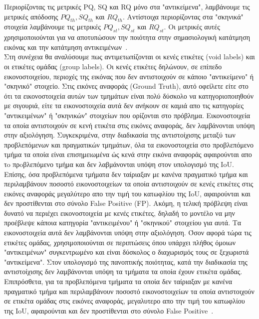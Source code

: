 \documentclass[12pt]{article}
\numberwithin{equation}{section}
\begin{document}
\noindent Περιορίζοντας τις μετρικές PQ, SQ και RQ μόνο στα "αντικείμενα", λαμβάνουμε τις μετρικές απόδοσης \(PQ_{th}, SQ_{th}\) και \(RQ_{th}\). Αντίστοιχα περιορίζοντας στα "σκηνικά" στοιχεία λαμβάνουμε τις μετρικές \(PQ_{st}, SQ_{st}\) και \(RQ_{st}\). Οι μετρικές αυτές χρησιμοποιούνται για να αποτυπώσουν την ποιότητα στην σημασιολογική κατάτμηση εικόνας και την κατάτμηση αντικειμένων~\cite{elharrouss2021panopticsegmentationreview}.\\

\noindent Στη συνέχεια θα αναλύσουμε πως αντιμετωπίζονται οι κενές ετικέτες (void labels) και οι ετικέτες ομάδας (group labels). Οι κενές ετικέτες δηλώνουν, σε επίπεδο εικονοστοιχείου, περιοχές της εικόνας που δεν αντιστοιχούν σε κάποιο "αντικείμενο" ή "σκηνικό" στοιχείο. Στις εικόνες αναφοράς (Ground Truth), αυτό οφείλετε είτε στο ότι τα εικονοστοιχεία αυτών των τμημάτων είναι πολύ δύσκολο να κατηγοριοποιηθούν με σιγουριά, είτε τα εικονοστοιχεία αυτά δεν ανήκουν σε καμιά απο τις κατηγορίες "αντικειμένων" ή "σκηνικών" στοιχείων που ορίζονται στο πρόβλημα. Εικονοστοιχεία τα οποία αντιστοιχούν σε κενή ετικέτα στις εικόνες αναφοράς, δεν λαμβάνονται υπόψη στην αξιολόγηση. Συγκεκριμένα, στην διαδικασία της αντιστοίχισης μεταξύ των προβλεπόμενων και πραγματικών τμημάτων, όλα τα εικονοστοιχεία στο προβλεπόμενο τμήμα τα οποία είναι επισημειωμένα ώς κενά στην εικόνα αναφοράς αφαιρούνται απο τo πρoβλεπόμενο τμήμα και δεν λαβμάνονται υπόψη στον υπολογισμό της IoU. Επίσης, όσα προβλεπόμενα τμήματα δεν ταίριαξαν με κανένα πραγματικό τμήμα και περιλαμβάνουν ποσοστό εικονοστοιχείων τα οποία αντιστοιχούν σε κενές ετικέτες στις εικόνες αναφοράς μεγαλύτερο απο την τιμή του κατωφλίου της IoU, αφαιρούνται και δεν προστίθενται στο σύνολο False Positive (FP).  Ακόμη, η τελική πρόβλεψη είναι δυνατό να περιέχει εικονοστοιχεία με κενές ετικέτες, δηλαδή το μοντέλο να μην προέβλεψε κάποια κατηγορία "αντικειμένου" ή "σκηνικού" στοιχείου για αυτά. Τα εικονοστοιχεία αυτά δεν λαμβάνονται υπόψη στην αξιολόγηση. Όσον αφορά τώρα τις ετικέτες ομάδας, χρησιμοποιούνται σε περιπτώσεις όπου υπάρχει πλήθος όμοιων "αντικειμένων" συγκεντρωμένο και είναι δύσκολος ο διαχωρισμός τους σε ξεχωριστά "αντικείμενα". Στον υπολογισμό της πανοπτικής ποιότητας, κατά την διαδικασία της αντιστοίχισης δεν λαμβάνονται υπόψη τα τμήματα τα οποία έχουν ετικέτα ομάδας. Επιπρόσθετα, για τα προβλεπόμενα τμήματα τα οποία δεν ταίριαξαν με κανένα πραγματικό τμήμα και περιλαμβάνουν ποσοστό εικονοστοιχείων τα οποία αντιστοιχούν σε ετικέτα ομάδας στις εικόνες αναφοράς, μεγαλυτερο απο την τιμή του κατωφλίου της IoU, αφαιρούνται και δεν προστίθενται στο σύνολο False Positive~\cite{Kirillov_2019_CVPR}.
\end{document}

